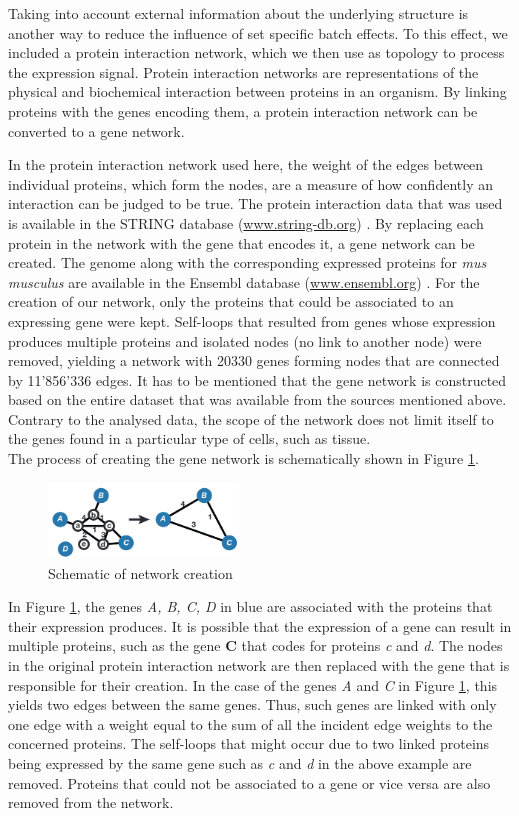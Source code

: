 \documentclass[10pt,conference,compsocconf]{IEEEtran}
\begin{document}
Taking into account external information about the underlying structure is another way to reduce the influence of set specific batch effects. To this effect, we included a protein interaction network, which we then use as topology to process the expression signal. Protein interaction networks are representations of the physical and biochemical interaction between proteins in an organism. By linking proteins with the genes encoding them, a protein interaction network can be converted to a gene network. 
\par
In the protein interaction network used here, the weight of the edges between individual proteins, which form the nodes, are a measure of how confidently an interaction can be judged to be true. The protein interaction data that was used is available in the STRING database (\url{www.string-db.org}) \cite{Szklarczyk2016}. By replacing each protein in the network with the gene that encodes it, a gene network can be created. The genome along with the corresponding expressed proteins for \textit{mus musculus} are available in the Ensembl database (\url{www.ensembl.org}) \cite{Zerbino2017}. For the creation of our network, only the proteins that could be associated to an expressing gene were kept.
Self-loops that resulted from genes whose expression produces multiple proteins and isolated nodes (no link to another node) were removed, yielding a network with 20330 genes forming nodes that are connected by 11'856'336 edges. It has to be mentioned that the gene network is constructed based on the entire dataset that was available from the sources mentioned above. Contrary to the analysed data, the scope of the network does not limit itself to the genes found in a particular type of cells, such as tissue.  \\
The process of creating the gene network is schematically shown in Figure \ref{fig:network_creation}.
\begin{figure}
	\centering
	\includegraphics[width=0.45\textwidth]{network.png}
	\caption{Schematic of network creation}
	\label{fig:network_creation}
\end{figure}
In Figure \ref{fig:network_creation}, the genes \textit{A, B, C, D} in blue are associated with the proteins that their expression produces. It is possible that the expression of a gene can result in multiple proteins, such as the gene \textbf{C} that codes for proteins \textit{c} and \textit{d}. The nodes in the original protein interaction network are then replaced with the gene that is responsible for their creation. In the case of the genes \textit{A} and \textit{C} in Figure \ref{fig:network_creation}, this yields two edges between the same genes. Thus, such genes are linked with only one edge with a weight equal to the sum of all the incident edge weights to the concerned proteins. The self-loops that might occur due to two linked proteins being expressed by the same gene such as \textit{c} and \textit{d} in the above example are removed. Proteins that could not be associated to a gene or vice versa are also removed from the network.
\end{document}
